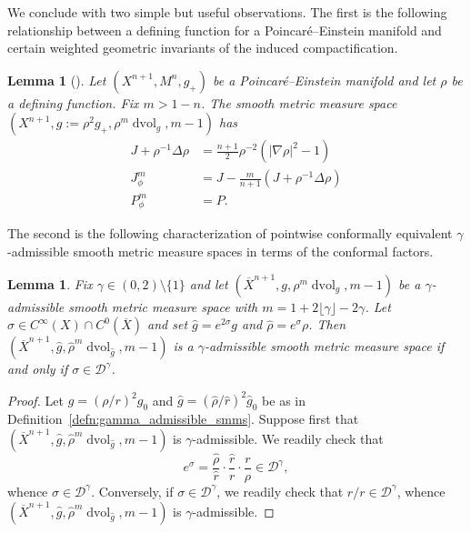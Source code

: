 \documentclass{amsart}
\newtheorem{lem}[thm]{Lemma}
\theoremstyle{definition}
\theoremstyle{remark}
\numberwithin{equation}{section}
\begin{document}
We conclude with two simple but useful observations.  The first is the following relationship between a defining function for a Poincar\'e--Einstein manifold and certain weighted geometric invariants of the induced compactification.

\begin{lem}[{\cite[Lemma~3.2]{CaseChang2013}}]
\label{lem:pe_smms_formulae}
Let $(X^{n+1},M^n,g_+)$ be a Poincar\'e--Einstein manifold and let $\rho$ be a defining function.  Fix $m>1-n$.  The smooth metric measure space $(X^{n+1},g:=\rho^2g_+,\rho^m\operatorname{dvol}_{g},m-1)$ has
\begin{align}
\label{eqn:J_to_grad} J + \rho^{-1}\Delta\rho & = \frac{n+1}{2}\rho^{-2}\left({\lvert}\nabla\rho{\rvert}^2 - 1 \right) \\
\label{eqn:J_to_weight} J_\phi^m & = J - \frac{m}{n+1}\left(J + \rho^{-1}\Delta\rho\right) \\
\label{eqn:P_to_weight} P_\phi^m & = P .
\end{align}
\end{lem}

The second is the following characterization of pointwise conformally equivalent $\gamma$-admissible smooth metric measure spaces in terms of the conformal factors.

\begin{lem}
 \label{lem:gamma_admissible_mC}
 Fix $\gamma\in(0,2)\setminus\{1\}$ and let $({\overline{X}}^{n+1},g,\rho^m\operatorname{dvol}_g,m-1)$ be a $\gamma$-admissible smooth metric measure space with $m=1+2\lfloor\gamma\rfloor-2\gamma$.  Let $\sigma\in C^\infty(X)\cap C^0({\overline{X}})$ and set ${\widehat{g}}=e^{2\sigma}g$ and ${\widehat{\rho}}=e^\sigma\rho$.  Then $({\overline{X}}^{n+1},{\widehat{g}},{\widehat{\rho}}^m\operatorname{dvol}_{\widehat{g}},m-1)$ is a $\gamma$-admissible smooth metric measure space if and only if $\sigma\in{\mathcal{D}}^\gamma$.
\end{lem}

\begin{proof}
 Let $g=(\rho/r)^2g_0$ and ${\widehat{g}}=({\widehat{\rho}}/{\widehat{r}})^2{\widehat{g}}_0$ be as in Definition~\ref{defn:gamma_admissible_smms}.  Suppose first that $({\overline{X}}^{n+1},{\widehat{g}},{\widehat{\rho}}^m\operatorname{dvol}_{\widehat{g}},m-1)$ is $\gamma$-admissible.  We readily check that
 \[ e^\sigma = \frac{\widehat{\rho}}{\widehat{r}}\cdot\frac{\widehat{r}}{r}\cdot\frac{r}{\rho} \in {\mathcal{D}}^\gamma, \]
 whence $\sigma\in{\mathcal{D}}^\gamma$.  Conversely, if $\sigma\in{\mathcal{D}}^\gamma$, we readily check that ${\widehat{r}}/r\in{\mathcal{D}}^\gamma$, whence $({\overline{X}}^{n+1},{\widehat{g}},{\widehat{\rho}}^m\operatorname{dvol}_{\widehat{g}},m-1)$ is $\gamma$-admissible.
\end{proof}
\end{document}
